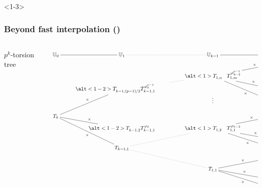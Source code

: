 \documentclass[10pt]{beamer}
\newcommand{\U}{\mathbb{U}}  %
\newcommand{\frob}{\varphi}  %
\newcommand{\0}{\mathcal{O}}  %
\begin{document}
\begin{frame}<1-3>
  \frametitle{Beyond fast interpolation (\cite{DF07})}
  
  \footnotesize

  \begin{columns}
    \begin{column}{0.2\textwidth}
      \normalsize
      $p^k$-torsion tree
    \end{column}
    \begin{column}{0.8\textwidth}
      \tiny
      \vspace{-3mm}

      \[\xymatrix@R=0pt@C=25pt{
	{\U_0 \ar@{-}[r]} & {\U_1 \ar@{.}[r]} &
	{\U_{k-1} \ar@{-}[r]} & {\U_k}
	\\
	& & & **[r](X - P_n)^{\frob^{p-1}_{k-1}}\ar@{-}"3,3"_-{\times} \\
	& & \alt<1>{T_{1,n}^{\phantom{\frob_{k-2}^{p-1}}}}{T_{1,m}^{\frob_{k-2}^{p-1}}}\ar@{.}"4,2" & {\vdots} \\
	& \alt<1-2>{T_{k-1,(p-1)/2}^{\phantom{\frob_0^{p-1}}}}{T_{k-1,1\phantom{(-p)/2}}^{\frob_0^{p-1}}}\ar@{-}"7,1"_{\times} & & **[r](X-P_n)^{\frob_{k-1}}\ar@{-}"3,3"_-{\times} \\
	& & {\vdots} & **[r](X - P_n)\ar@{-}"3,3"^-{\times} \\
	& & & \\
    T_k & & & **[r](X - P_2)^{\frob^{p-1}_{k-1}}\ar@{-}"8,3"_-{\times} \\
	& \alt<1-2>{T_{k-1,2}^{\phantom{\frob_0}}}{T_{k-1,1}^{\frob_0}}\ar@{-}"7,1"_{\times} & \alt<1>{T_{1,2}^{\phantom{\frob_{k-2}}}}{T_{1,1}^{\frob_{k-2}}}\ar@{.}"10,2" & {\vdots} \\
	& & & **[r](X-P_2)^{\frob_{k-1}}\ar@{-}"8,3"_-{\times}  \\
	& T_{k-1,1}\ar@{-}"7,1"^{\times} & & **[r](X - P_2)\ar@{-}"8,3"^-{\times} \\
	& & & **[r](X - P_1)^{\frob^{p-1}_{k-1}}\ar@{-}"12,3"_-{\times}  \\
	& & T_{1,1}\ar@{.}"10,2" & {\vdots} \\
	& & & **[r](X - P_1)^{\frob_{k-1}}\ar@{-}"12,3"_-{\times} \\
	& & & **[r](X - P_1)\ar@{-}"12,3"^-{\times}
      }\]
    \end{column}
  \end{columns}
\end{frame}

\end{document}
